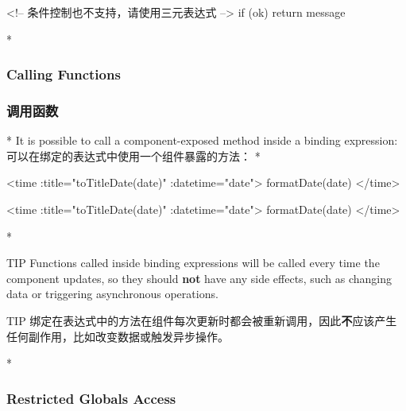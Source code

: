 \begin{paracol}{2}
\begin{codeHtml}
<!-- 条件控制也不支持，请使用三元表达式 -->
{{ if (ok) { return message } }}
\end{codeHtml}  

\switchcolumn[0]*%
\subsubsection{Calling Functions}
\switchcolumn
\subsubsection{调用函数}
\switchcolumn[0]*%
It is possible to call a component-exposed method inside a binding
expression:
\switchcolumn
可以在绑定的表达式中使用一个组件暴露的方法：
\switchcolumn[0]*%
\begin{codeHtml}
<time :title="toTitleDate(date)" :datetime="date">
{{ formatDate(date) }}
</time>
\end{codeHtml}  
\switchcolumn
\begin{codeHtml}
<time :title="toTitleDate(date)" :datetime="date">
{{ formatDate(date) }}
</time>
\end{codeHtml}  
\switchcolumn[0]*%
\begin{vueQuote}{TIP}
Functions called inside binding expressions will be called every time
the component updates, so they should \textbf{not} have any side
effects, such as changing data or triggering asynchronous operations.
\end{vueQuote}
\switchcolumn
\begin{vueQuote}{TIP}
绑定在表达式中的方法在组件每次更新时都会被重新调用，因此\textbf{不}应该产生任何副作用，比如改变数据或触发异步操作。
\end{vueQuote}

\switchcolumn[0]*%
\subsubsection{Restricted Globals Access}
\switchcolumn

\end{paracol}
